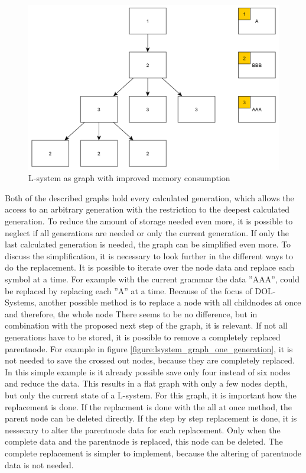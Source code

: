 \documentclass[english]{cpp-hmwk}
\begin{document}
\begin{figure}[h!]
	\centering
	\includegraphics[width=0.8\columnwidth]{../graphs/LSystem/examples/lsystem_graph_reduced_example.png}
	\caption{L-system as graph with improved memory consumption}
	\label{figure:lsystem_graph_mem_reduction}
\end{figure}

\medskip
\noindent Both of the described graphs hold every calculated generation, which allows the access to an arbitrary generation with the restriction to the deepest calculated generation. To reduce the amount of storage needed even more, it is possible to neglect if all generations are needed or only the current generation. If only the last calculated generation is needed, the graph can be simplified even more. To discuss the simplification, it is necessary to look further in the different ways to do the replacement. It  is possible to iterate over the node data and replace each symbol at a time. For example with the current grammar the data ''AAA'', could be replaced by replacing each ''A'' at a time. Because of the focus of DOL-Systems, another possible method is to replace a node with all childnodes at once and therefore, the whole node\newline
There seems to be no difference, but in combination with the proposed next step of the graph, it is relevant. If not all generations have to be stored, it is possible to remove a completely replaced parentnode. For example in figure \ref{figure:lsystem_graph_one_generation}, it is not needed to save the crossed out nodes, because they are completely replaced. In this simple example is it already possible save only four instead of six nodes and reduce the data. This results in a flat graph with only a few nodes depth, but only the current state of a L-system. For this graph, it is  important how the replacement is done. If the replacment is done with the all at once method, the parent node can be deleted directly. If the step by step replacement is done, it is nessecary to alter the parentnode data for each replacement. Only when the complete data and the parentnode is replaced, this node can be deleted. The complete replacement is simpler to implement, because the altering of parentnode data is not needed.
\end{document}
